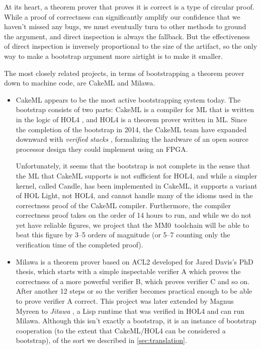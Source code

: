 \documentclass[runningheads]{llncs}
\newcommand{\mmO}{\textsf{MM0}}
\begin{document}
At its heart, a theorem prover that proves it is correct is a type of circular proof. While a proof of correctness can significantly amplify our confidence that we haven't missed any bugs, we must eventually turn to other methods to ground the argument, and direct inspection is always the fallback. But the effectiveness of direct inspection is inversely proportional to the size of the artifact, so the only way to make a bootstrap argument more airtight is to make it smaller.

The most closely related projects, in terms of bootstrapping a theorem prover down to machine code, are CakeML and Milawa.
\begin{itemize}
\item CakeML \cite{Kumar14} appears to be the most active bootstrapping system today. The bootstrap consists of two parts: CakeML is a compiler for ML that is written in the logic of HOL4 \cite{slind08}, and HOL4 is a theorem prover written in ML. Since the completion of the bootstrap in 2014, the CakeML team have expanded downward with \emph{verified stacks} \cite{loow19}, formalizing the hardware of an open source processor design they could implement using an FPGA.

Unfortunately, it seems that the bootstrap is not complete in the sense that the ML that CakeML supports is not sufficient for HOL4, and while a simpler kernel, called Candle, has been implemented in CakeML, it supports a variant of HOL Light, not HOL4, and cannot handle many of the idioms used in the correctness proof of the CakeML compiler. Furthermore, the compiler correctness proof takes on the order of 14 hours to run, and while we do not yet have reliable figures, we project that the \mmO\ toolchain will be able to beat this figure by 3--5 orders of magnitude (or 5--7 counting only the verification time of the completed proof).

\item Milawa \cite{davis09} is a theorem prover based on ACL2 developed for Jared Davis's PhD thesis, which starts with a simple inspectable verifier A which proves the correctness of a more powerful verifier B, which proves verifier C and so on. After another 12 steps or so the verifier becomes practical enough to be able to prove verifier A correct. This project was later extended by Magnus Myreen to \emph{Jitawa} \cite{myreen11}, a Lisp runtime that was verified in HOL4 and can run Milawa. Although this isn't exactly a bootstrap, it is an instance of bootstrap cooperation (to the extent that CakeML/HOL4 can be considered a bootstrap), of the sort we described in \autoref{sec:translation}.
\end{itemize}
\end{document}
